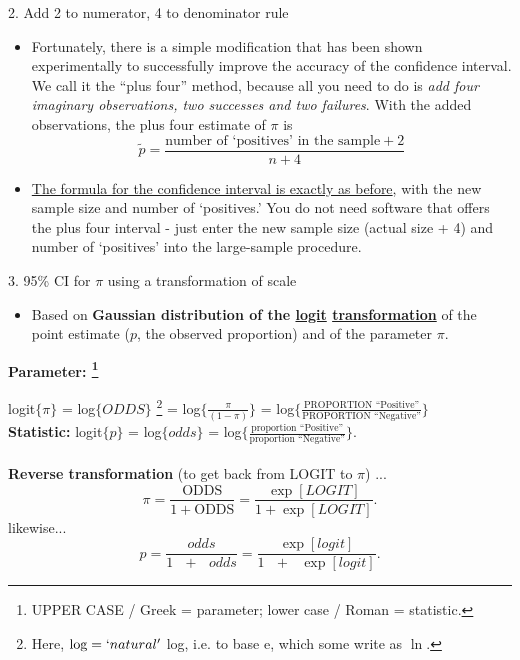 \documentclass[10pt,handout]{beamer}\usepackage[]{graphicx}\usepackage[]{color}
\begin{document}
\begin{frame}{2. Add 2 to numerator, 4 to denominator rule}
	\small
	\begin{itemize}
		\setlength\itemsep{1em}
		
		\item Fortunately, there is a simple modification that has been shown experimentally
		to successfully improve the accuracy of the confidence interval. We call it the ``plus
		four'' method, because all you need to do is \textit{add four imaginary observations, 
			two successes and two failures}. With the added observations, the plus four estimate of $\pi$ is
		$$\widetilde{p} =\frac{\textrm{number of `positives' in the sample} + 2}{n+4}$$ 
		
		\item \underline{The formula for the confidence interval is exactly as before}, with the new sample
		size and number of `positives.' You do not need software that offers the plus four
		interval - just enter the new sample size (actual size + 4) and number of `positives'
		into the large-sample procedure.
	\end{itemize}
\end{frame}


\begin{frame}{3. 95\% CI for $\pi$ using a transformation of scale}
	
	\begin{itemize}
		\item Based on \textbf{Gaussian distribution of the \underline{logit} \underline{transformation}} of  the point estimate ($p$, the observed proportion) and of  the parameter $\pi.$
	\end{itemize}
	
	\small
	\textbf{Parameter: \footnote{UPPER CASE / Greek = parameter; lower case / Roman = statistic.} }
	
	logit$\{ \pi \}$
	= log$\{ ODDS \}$ \footnote{Here, $\textrm{log} = `natural'$ log, i.e. to base e, which some write as $\ln.$} 
	=   log$\big\{ \frac{\pi}{(1-\pi)} \big\}$ 
	=  log$ \big\{ \frac{ \textrm{PROPORTION ``Positive''} }
	{ \textrm{PROPORTION ``Negative''} } \big\}$ \\
	
	\textbf{Statistic: } logit$\{ p \}$
	= log$\{ odds \}$ 
	=  log$ \big\{ \frac{ \textrm{proportion ``Positive''} }
	{ \textrm{proportion ``Negative''} } \big\}.$ \\ \ \\
	
	\textbf{Reverse transformation} (to get back from LOGIT to $\pi $) ...
	$$\pi = \frac{\textrm{ODDS}}{1 + \textrm{ODDS}} = \frac{\exp [LOGIT]}{1 + \exp[LOGIT]}.$$
	likewise...
	$$p = \frac{odds}{1 \textrm{ }+ \textrm{ }odds} = \frac{\exp [logit]}{1\textrm{ }+\textrm{ }\exp [logit]}.$$
	
	
\end{frame}
\end{document}
